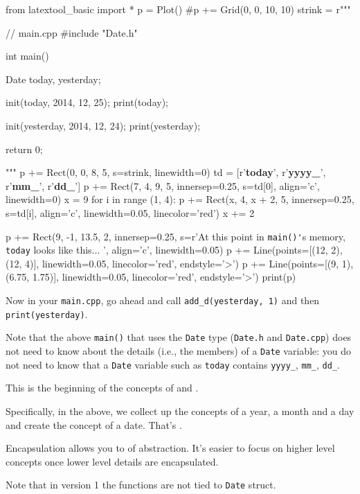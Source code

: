 \begin{python}
from latextool_basic import *
p = Plot()
#p += Grid(0, 0, 10, 10)
strink = r"""
\begin{consolethree}[escapeinside=||]
// main.cpp
#include "Date.h"

int main()
{
    Date today, yesterday;

    init(today, 2014, 12, 25);
    print(today);
    
    init(yesterday, 2014, 12, 24);
    print(yesterday);

    return 0;
}
\end{consolethree}
"""
p += Rect(0, 0, 8, 5, s=strink, linewidth=0)
td = [r'\textbf{today}', r'\textbf{yyyy\_}', r'\textbf{mm\_}', r'\textbf{dd\_}']
p += Rect(7, 4, 9, 5, innersep=0.25, s=td[0], align='c', linewidth=0)
x = 9
for i in range (1, 4):
      p += Rect(x, 4, x + 2, 5, innersep=0.25, s=td[i], align='c', linewidth=0.05, linecolor='red')
      x += 2

p += Rect(9, -1, 13.5, 2, innersep=0.25, s=r'At this point in \texttt{main()\'}s memory, \texttt{today} looks like this... ', align='c', linewidth=0.05)
p += Line(points=[(12, 2), (12, 4)], linewidth=0.05, linecolor='red', endstyle='>')
p += Line(points=[(9, 1), (6.75, 1.75)], linewidth=0.05, linecolor='red', endstyle='>')
print(p)
\end{python}

Now in your \texttt{main.cpp}, go ahead and call \texttt{add\_d(yesterday,
1)} and then \texttt{print(yesterday)}.

Note that the above \texttt{main()} that uses the \texttt{Date} type
(\texttt{Date.h} and \texttt{Date.cpp}) does not need to know about the
details (i.e., the members) of a \texttt{Date} variable: you do not need
to know that a \texttt{Date} variable such as \texttt{today} contains
\texttt{yyyy\_}, \texttt{mm\_}, \texttt{dd\_}.

This is the beginning of the concepts of  and
.

Specifically, in the above, we collect up the concepts of a year, a
month and a day and create the concept of a date. That's
.

Encapsulation allows you to  of
abstraction. It's easier to focus on higher level
concepts once lower level details are encapsulated.

Note that in version 1 the functions are not tied to \texttt{Date} struct.

